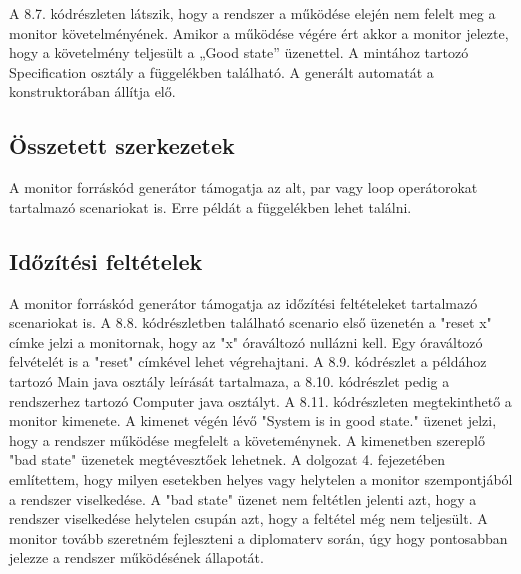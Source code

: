 A 8.7. kódrészleten látszik, hogy a rendszer a működése elején nem felelt meg a monitor követelményének.
Amikor a működése végére ért akkor a monitor jelezte, hogy a követelmény teljesült a „Good state” üzenettel.
A mintához tartozó Specification osztály a függelékben található.
A generált automatát a konstruktorában állítja elő.

\subsection{Összetett szerkezetek}

A monitor forráskód generátor támogatja az alt, par vagy loop operátorokat tartalmazó scenariokat is.
Erre példát a függelékben lehet találni.

\clearpage\subsection{Időzítési feltételek}

A monitor forráskód generátor támogatja az időzítési feltételeket tartalmazó scenariokat is.
A 8.8. kódrészletben található scenario első üzenetén a "reset x" címke jelzi a monitornak, hogy az "x" óraváltozó nullázni kell.
Egy óraváltozó felvételét is a "reset" címkével lehet végrehajtani.
A 8.9. kódrészlet a példához tartozó Main java osztály leírását tartalmaza, a 8.10. kódrészlet pedig a rendszerhez tartozó Computer java osztályt.
A 8.11. kódrészleten megtekinthető a monitor kimenete.
A kimenet végén lévő "System is in good state." üzenet jelzi, hogy a rendszer működése megfelelt a követeménynek.
A kimenetben szereplő "bad state" üzenetek megtévesztőek lehetnek.
A dolgozat 4. fejezetében említettem, hogy milyen esetekben helyes vagy helytelen a monitor szempontjából a rendszer viselkedése.
A "bad state" üzenet nem feltétlen jelenti azt, hogy a rendszer viselkedése helytelen csupán azt, hogy a feltétel még nem teljesült.
A monitor tovább szeretném fejleszteni a diplomaterv során, úgy hogy pontosabban jelezze a rendszer működésének állapotát.

